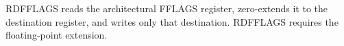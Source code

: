 RDFFLAGS reads the architectural FFLAGS register, zero-extends it to the destination register, and writes only that destination. RDFFLAGS requires the floating-point extension.

